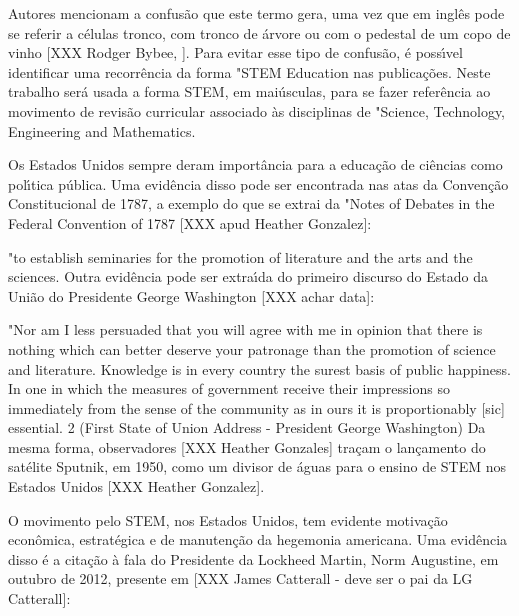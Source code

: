 \documentclass[
12pt,		%
openright,	%
twoside,  %
a4paper,			%
chapter=TITLE,		%
english,			%
french,				%
spanish,			%
brazil				%
]{USPSC-classe/USPSC}
\begin{document}
Autores mencionam a confus\~ao que este termo gera, uma vez que em ingl\^es pode se referir a c\'elulas tronco, com tronco de \'arvore ou com o pedestal de um copo de vinho [XXX Rodger Bybee, ]. Para evitar esse tipo de confus\~ao, \'e poss\'{\i}vel identificar uma recorr\^encia da forma "STEM Education nas publica\c{c}\~oes. Neste trabalho ser\'a usada a forma STEM, em mai\'usculas, para se fazer refer\^encia ao movimento de revis\~ao curricular associado \`as disciplinas de "Science, Technology, Engineering and Mathematics.  


Os Estados Unidos sempre deram import\^ancia para a educa\c{c}\~ao de ci\^encias como pol\'{\i}tica p\'ublica. Uma evid\^encia disso pode ser encontrada nas atas da Conven\c{c}\~ao Constitucional de 1787, a exemplo do que se extrai da "Notes of Debates in the Federal Convention of 1787 [XXX apud Heather Gonzalez]:


"to establish seminaries for the promotion of literature and the arts and the sciences.
Outra evid\^encia pode ser extra\'{\i}da do primeiro discurso do Estado da Uni\~ao do Presidente George Washington [XXX achar data]:


"Nor am I less persuaded that you will agree with me in opinion that there is nothing which can better deserve your patronage than the promotion of science and literature. Knowledge is in every country the surest basis of public happiness. In one in which the measures of government receive their impressions so immediately from the sense of the community as in ours it is proportionably [sic] essential. 2 (First State of Union Address - President George Washington)
Da mesma forma, observadores [XXX Heather Gonzales] tra\c{c}am o lan\c{c}amento do sat\'elite Sputnik, em 1950, como um divisor de \'aguas para o ensino de STEM nos Estados Unidos [XXX Heather Gonzalez].


O movimento pelo STEM, nos Estados Unidos, tem evidente motiva\c{c}\~ao econ\^omica, estrat\'egica e de manuten\c{c}\~ao da hegemonia americana. Uma evid\^encia disso \'e a cita\c{c}\~ao \`a fala do Presidente da Lockheed Martin, Norm Augustine, em outubro de 2012, presente em [XXX James Catterall - deve ser o pai da LG Catterall]:
\end{document}
